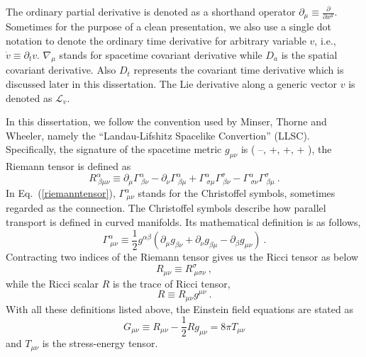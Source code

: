 The ordinary partial derivative is denoted as a shorthand operator $
\partial_{\mu} \equiv \frac{\partial}{\partial x^{\mu}}$. Sometimes for the purpose of a clean presentation, we also use a single dot notation to denote the ordinary time derivative for arbitrary variable $v$, i.e., ${\dot v} \equiv \partial_{t}v$. $\nabla_{\mu}$ stands for spacetime covariant derivative while $D_{a}$ is the spatial covariant derivative. Also $D_{t}$ represents the covariant time derivative which is discussed later in this dissertation. The Lie derivative along a generic vector $v$ is denoted as $\mathcal{L}_{v}$. 

In this dissertation, we follow the convention used by Minser, Thorne and Wheeler\cite{Misner:1974qy}, namely the ``Landau-Lifshitz Spacelike Convertion'' (LLSC). Specifically, the signature of the spacetime metric $g_{\mu\nu}$ is ( --, +, +, + ), the Riemann tensor is defined as 
\begin{equation}\label{riemanntensor}
	R^{\alpha}_{~\beta \mu \nu} \equiv 
	\partial_{\mu}\Gamma^{\alpha}_{~\beta \nu} - 
	\partial_{\nu}\Gamma^{\alpha}_{~\beta \mu} + \Gamma^{\alpha}_{~\sigma \mu}\Gamma^{\sigma}_{~\beta \nu} - \Gamma^{\alpha}_{~\sigma \nu}\Gamma^{\sigma}_{~\beta\mu} \ .
\end{equation}
In Eq.~(\ref{riemanntensor}), $\Gamma^{\alpha}_{~\mu\nu}$ stands for the Christoffel symbols, sometimes regarded as the connection. The Christoffel symbols describe how parallel transport is defined in curved manifolds. Its mathematical definition is as follows, 
\begin{equation}
	\Gamma^{\alpha}_{~\mu\nu} \equiv \frac{1}{2}g^{\alpha\beta}\left(\partial_{\mu}g_{\beta\nu} + \partial_{\nu}g_{\beta\mu} - \partial_{\beta}g_{\mu\nu}\right) \ .
\end{equation}
Contracting two indices of the Riemann tensor gives us the Ricci tensor as below
\begin{equation}
	R_{\mu\nu} \equiv R^{\sigma}_{~\mu\sigma\nu} \ ,  
\end{equation}
while the Ricci scalar $R$ is the trace of Ricci tensor, 
\begin{equation}
	R \equiv R_{\mu\nu}g^{\mu\nu}\ .
\end{equation}
With all these definitions listed above, the Einstein field equations are stated as 
\begin{equation}
	G_{\mu\nu} \equiv R_{\mu\nu} - \frac{1}{2} R g_{\mu\nu} = 8\pi T_{\mu\nu} 
\end{equation}
and $T_{\mu\nu}$ is the stress-energy tensor. 

